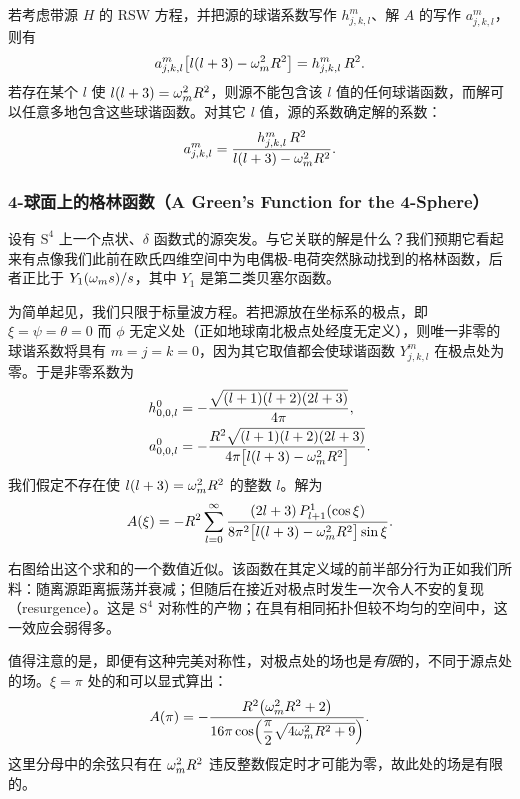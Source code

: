 若考虑带源 $H$ 的 RSW 方程，并把源的球谐系数写作 $h^{m}_{j,k,l}$、解 $A$ 的写作 $a^{m}_{j,k,l}$，则有
\begin{equation}
a^{m}_{j,k,l}\bigl[l(l+3)-\omega_m^{2}R^{2}\bigr] = h^{m}_{j,k,l}\,R^{2}.
\end{equation}
若存在某个 $l$ 使 $l(l+3)=\omega_m^{2}R^{2}$，则源不能包含该 $l$ 值的任何球谐函数，而解可以任意多地包含这些球谐函数。对其它 $l$ 值，源的系数确定解的系数：
\begin{equation}
a^{m}_{j,k,l} = \frac{h^{m}_{j,k,l}\,R^{2}}{l(l+3)-\omega_m^{2}R^{2}}.
\end{equation}

\subsubsection{4-球面上的格林函数（A Green's Function for the 4-Sphere）}

设有 $\text{S}^{4}$ 上一个点状、$\delta$ 函数式的源突发。与它关联的解是什么？我们预期它看起来有点像我们此前在欧氏四维空间中为电偶极-电荷突然脉动找到的格林函数，后者正比于 $Y_{1}(\omega_m s)/s$，其中 $Y_{1}$ 是第二类贝塞尔函数。

为简单起见，我们只限于标量波方程。若把源放在坐标系的极点，即 $\xi=\psi=\theta=0$ 而 $\phi$ 无定义处（正如地球南北极点处经度无定义），则唯一非零的球谐系数将具有 $m=j=k=0$，因为其它取值都会使球谐函数 $Y^{m}_{j,k,l}$ 在极点处为零。于是非零系数为
\begin{align}
h^{0}_{0,0,l} &= -\frac{\sqrt{(l+1)(l+2)(2l+3)}}{4\pi},\\
a^{0}_{0,0,l} &= -\frac{R^{2}\sqrt{(l+1)(l+2)(2l+3)}}{4\pi\bigl[l(l+3)-\omega_m^{2}R^{2}\bigr]}.
\end{align}
我们假定不存在使 $l(l+3)=\omega_m^{2}R^{2}$ 的整数 $l$。解为
\begin{equation}
A(\xi) = -R^{2}\sum_{l=0}^{\infty}\frac{(2l+3)\,P^{1}_{l+1}(\cos\xi)}{8\pi^{2}\bigl[l(l+3)-\omega_m^{2}R^{2}\bigr]\sin\xi}.
\end{equation}


右图给出这个求和的一个数值近似。该函数在其定义域的前半部分行为正如我们所料：随离源距离振荡并衰减；但随后在接近对极点时发生一次令人不安的复现（resurgence）。这是 $\text{S}^{4}$ 对称性的产物；在具有相同拓扑但较不均匀的空间中，这一效应会弱得多。

值得注意的是，即便有这种完美对称性，对极点处的场也是\emph{有限}的，不同于源点处的场。$\xi=\pi$ 处的和可以显式算出：
\begin{equation}
A(\pi) = -\frac{R^{2}\bigl(\omega_m^{2}R^{2}+2\bigr)}{16\pi\cos\!\left(\dfrac{\pi}{2}\sqrt{4\omega_m^{2}R^{2}+9}\right)}.
\end{equation}
这里分母中的余弦只有在 $\omega_m^{2}R^{2}$ 违反整数假定时才可能为零，故此处的场是有限的。


